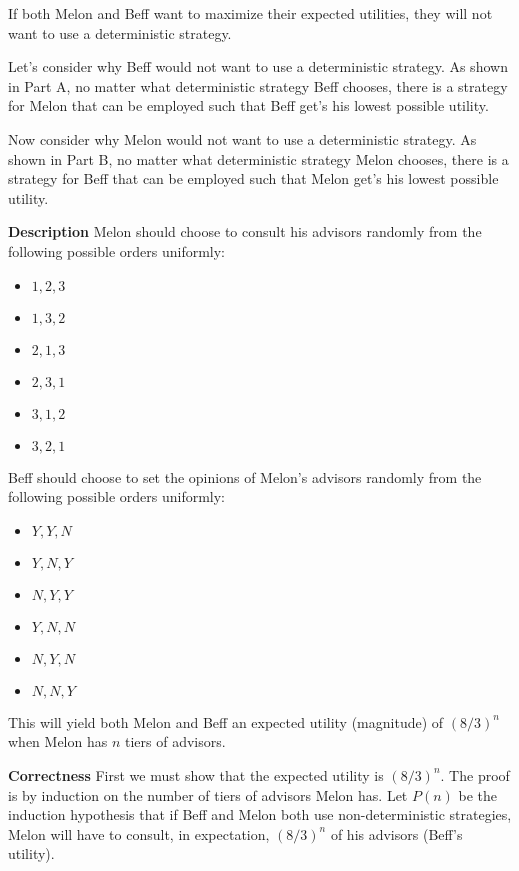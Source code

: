 \documentclass[12pt,twoside]{article}
\begin{document}
\begin{problems}
\begin{problemparts}
\problempart %

If both Melon and Beff want to maximize their expected utilities, they will
not want to use a deterministic strategy. 

Let's consider why Beff would not want to use a deterministic strategy. As
shown in Part A, no matter what deterministic strategy Beff chooses, there is
a strategy for Melon that can be employed such that Beff get's his lowest
possible utility.

Now consider why Melon would not want to use a deterministic strategy. As
shown in Part B, no matter what deterministic strategy Melon chooses, there
is a strategy for Beff that can be employed such that Melon get's his lowest
possible utility.

\problempart %

{\bf Description} Melon should choose to consult his advisors randomly from
the following possible orders uniformly:

\begin{itemize}
  \item $1,2,3$
  \item $1,3,2$
  \item $2,1,3$
  \item $2,3,1$
  \item $3,1,2$
  \item $3,2,1$
\end{itemize}

Beff should choose to set the opinions of Melon's advisors randomly from the
following possible orders uniformly:

\begin{itemize}
  \item $Y,Y,N$
  \item $Y,N,Y$
  \item $N,Y,Y$
  \item $Y,N,N$
  \item $N,Y,N$
  \item $N,N,Y$
\end{itemize}

This will yield both Melon and Beff an expected utility (magnitude) of
$\left(8 / 3\right)^n$ when Melon has $n$ tiers of advisors.

{\bf Correctness} First we must show that the expected utility is $\left(8 /
3\right)^n$. The proof is by induction on the number of tiers of advisors
Melon has. Let $P(n)$ be the induction hypothesis that if Beff and Melon both
use non-deterministic strategies, Melon will have to consult, in expectation,
$\left(8 / 3\right)^n$ of his advisors (Beff's utility).


\end{problemparts}
\end{problems}
\end{document}
